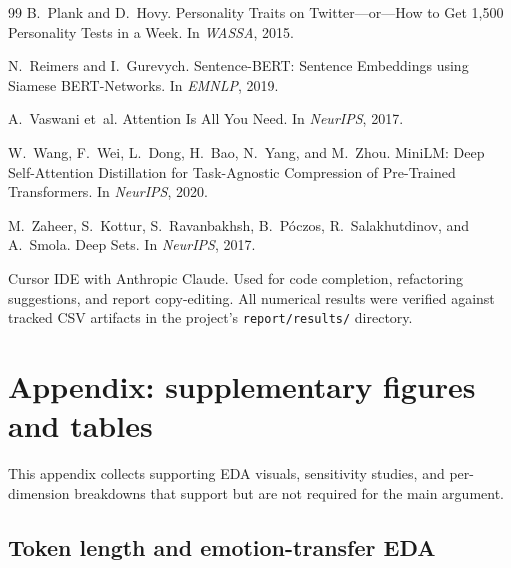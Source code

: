 \documentclass{article}
\begin{document}
{\begin{thebibliography}{99}
B.~Plank and D.~Hovy.
\newblock Personality Traits on Twitter---or---How to Get 1,500 Personality Tests in a Week.
\newblock In \emph{WASSA}, 2015.

N.~Reimers and I.~Gurevych.
\newblock Sentence-BERT: Sentence Embeddings using Siamese BERT-Networks.
\newblock In \emph{EMNLP}, 2019.

A.~Vaswani et~al.
\newblock Attention Is All You Need.
\newblock In \emph{NeurIPS}, 2017.

W.~Wang, F.~Wei, L.~Dong, H.~Bao, N.~Yang, and M.~Zhou.
\newblock MiniLM: Deep Self-Attention Distillation for Task-Agnostic Compression of Pre-Trained Transformers.
\newblock In \emph{NeurIPS}, 2020.

M.~Zaheer, S.~Kottur, S.~Ravanbakhsh, B.~P\'oczos, R.~Salakhutdinov, and A.~Smola.
\newblock Deep Sets.
\newblock In \emph{NeurIPS}, 2017.

Cursor IDE with Anthropic Claude.
\newblock Used for code completion, refactoring suggestions, and report copy-editing. All numerical results were verified against tracked CSV artifacts in the project's \texttt{report/results/} directory.

\end{thebibliography}
}

\newpage
\appendix

\section{Appendix: supplementary figures and tables}

This appendix collects supporting EDA visuals, sensitivity studies, and per-dimension breakdowns that support but are not required for the main argument.

\subsection{Token length and emotion-transfer EDA}
\end{document}
